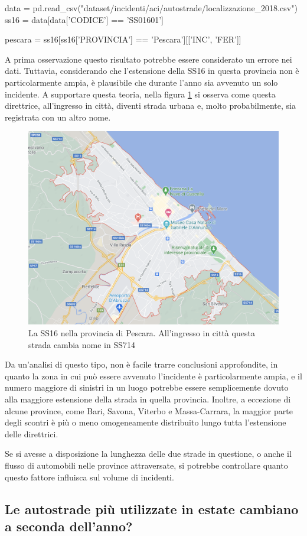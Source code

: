 \documentclass[a4paper,12pt]{report}
\begin{document}
\begin{code}
data = pd.read_csv("dataset/incidenti/aci/autostrade/localizzazione_2018.csv")
ss16 = data[data['CODICE'] == 'SS01601']

pescara = ss16[ss16['PROVINCIA'] == 'Pescara'][['INC', 'FER']]
\end{code}

A prima osservazione questo risultato potrebbe essere considerato un errore nei dati. 
Tuttavia, considerando che l'estensione della SS16 in questa provincia non 
è particolarmente ampia, è plausibile che durante l'anno sia avvenuto un solo incidente. 
A supportare questa teoria, nella figura \ref{fig:ss16-pescara} si osserva come 
questa direttrice, all'ingresso in città, diventi strada urbana e, molto probabilmente, 
sia registrata con un altro nome.

\begin{figure}
    \hfill\includegraphics[width=0.5\linewidth]{img/pescara_ss16.png}\hspace*{\fill}
    \caption{La SS16 nella provincia di Pescara. All'ingresso in città questa strada cambia nome in SS714}
    \label{fig:ss16-pescara}
\end{figure}

Da un'analisi di questo tipo, non è facile trarre conclusioni approfondite, in quanto la 
zona in cui può essere avvenuto l'incidente è particolarmente ampia, e il numero maggiore di 
sinistri in un luogo potrebbe essere semplicemente dovuto alla maggiore estensione della 
strada in quella provincia. 
Inoltre, a eccezione di alcune province, come Bari, Savona, Viterbo e Massa-Carrara, 
la maggior parte degli scontri è più o meno omogeneamente distribuito lungo tutta 
l'estensione delle direttrici. 

Se si avesse a disposizione la lunghezza delle due strade in questione, 
o anche il flusso di automobili nelle province attraversate, 
si potrebbe controllare quanto questo fattore influisca sul volume di incidenti. 

\subsection{Le autostrade più utilizzate in estate cambiano a seconda dell'anno?}
\end{document}
